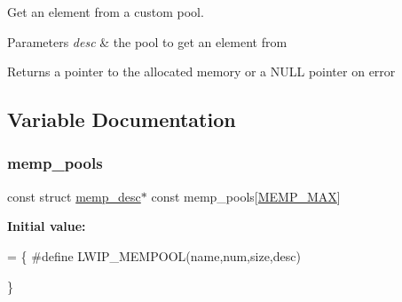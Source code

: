 Get an element from a custom pool.


\begin{DoxyParams}{Parameters}
{\em desc} & the pool to get an element from\\
\hline
\end{DoxyParams}
\begin{DoxyReturn}{Returns}
a pointer to the allocated memory or a N\+U\+LL pointer on error 
\end{DoxyReturn}


\subsection{Variable Documentation}
\mbox{\label{openmote-cc2538_2lwip_2src_2core_2memp_8c_ad78a1f656a766f2c6341aa466762b883}} 
\subsubsection{\texorpdfstring{memp\+\_\+pools}{memp\_pools}}
{\footnotesize\ttfamily const struct \hyperlink{structmemp__desc}{memp\+\_\+desc}$\ast$ const memp\+\_\+pools\mbox{[}\hyperlink{openmote-cc2538_2lwip_2src_2include_2lwip_2memp_8h_a85a164b1f7764951cc685ea525114e57a3387042084427642949f3223c7ddd321}{M\+E\+M\+P\+\_\+\+M\+AX}\mbox{]}}

{\bfseries Initial value\+:}
\begin{DoxyCode}
= \{
\textcolor{preprocessor}{#define LWIP\_MEMPOOL(name,num,size,desc) }

\}
\end{DoxyCode}
